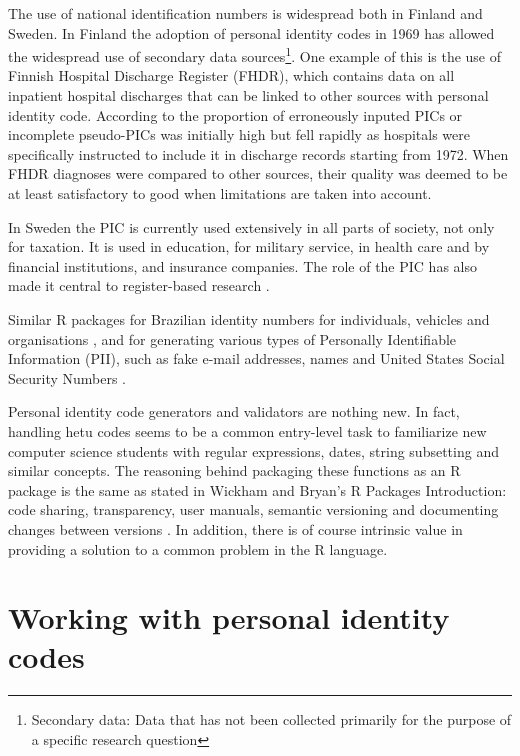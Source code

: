 The use of national identification numbers is widespread both in Finland and Sweden. In Finland the adoption of personal identity codes in 1969 has allowed the widespread use of secondary data sources\footnote{Secondary data: Data that has not been collected primarily for the purpose of a specific research question}. One example of this is the use of Finnish Hospital Discharge Register (FHDR), which contains data on all inpatient hospital discharges that can be linked to other sources with personal identity code. According to \citet{reijosund} the proportion of erroneously inputed PICs or incomplete pseudo-PICs was initially high but fell rapidly as hospitals were specifically instructed to include it in discharge records starting from 1972. When FHDR diagnoses were compared to other sources, their quality was deemed to be at least satisfactory to good when limitations are taken into account.

In Sweden the PIC is currently used extensively in all parts of society, not only for taxation. It is used in education, for military service, in health care and by financial institutions, and insurance companies. The role of the PIC has also made it central to register-based research \citep{scb2016}.


Similar R packages  for Brazilian identity numbers for individuals, vehicles and organisations \citep{numbersbr}, and  for generating various types of Personally Identifiable Information (PII), such as fake e-mail addresses, names and United States Social Security Numbers \citep{generator}.

Personal identity code generators and validators are nothing new. In fact, handling hetu codes seems to be a common entry-level task to familiarize new computer science students with regular expressions, dates, string subsetting and similar concepts. The reasoning behind packaging these functions as an R package is the same as stated in Wickham and Bryan's R Packages Introduction: code sharing, transparency, user manuals, semantic versioning and documenting changes between versions \citep{wickham}. In addition, there is of course intrinsic value in providing a solution to a common problem in the R language.

\section{Working with personal identity codes}

